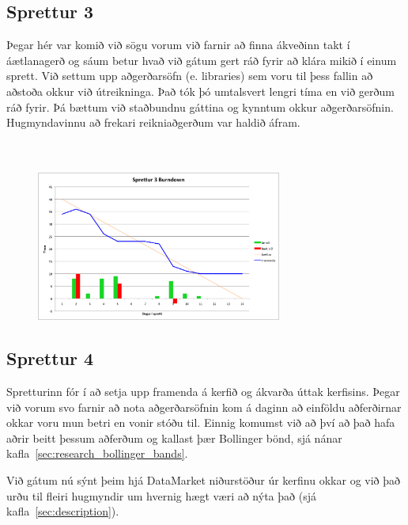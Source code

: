 \documentclass{article}
\begin{document}
\subsection{Sprettur 3}
Þegar hér var komið við sögu vorum við farnir að finna ákveðinn takt í
áætlanagerð og sáum betur hvað við gátum gert ráð fyrir að klára mikið 
í einum sprett. Við settum upp aðgerðarsöfn (e. libraries) sem voru til þess fallin að
aðstoða okkur við útreikninga. Það tók þó umtalsvert lengri tíma en við gerðum
ráð fyrir. Þá bættum við staðbundnu gáttina og kynntum okkur aðgerðarsöfnin.
Hugmyndavinnu að frekari reikniaðgerðum var haldið áfram.
\hfil \\
\hfil \\
\hfil \\
\begin{figure}[H]
 \centering
 \includegraphics[width=0.72\textwidth]{Sprettur3_Burndown.png}
 \caption{}
\end{figure}
\label{fig:sp3}
\newpage
\subsection{Sprettur 4}
Spretturinn fór í að setja upp framenda á kerfið og ákvarða úttak kerfisins. 
Þegar við vorum svo farnir að nota aðgerðarsöfnin 
kom á daginn að einföldu aðferðirnar okkar voru mun betri en vonir stóðu til.
Einnig komumst við að því að það hafa aðrir beitt þessum aðferðum 
og kallast þær Bollinger bönd, sjá nánar kafla~\ref{sec:research_bollinger_bands}. 

Við gátum nú sýnt þeim hjá DataMarket niðurstöður úr kerfinu okkar og við það
urðu til fleiri hugmyndir um hvernig hægt væri að nýta það (sjá kafla~\ref{sec:description}).
\end{document}
